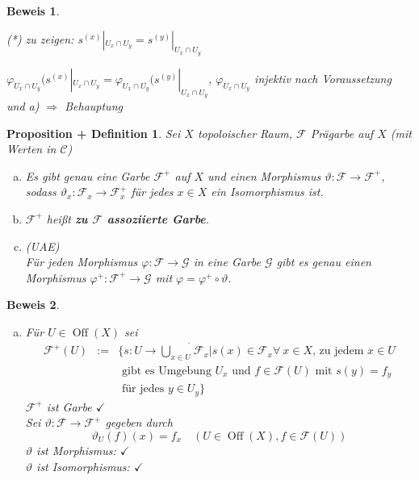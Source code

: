 \documentclass[paper = A4, fontsize=12pt, numbers=noendperiod, chapterprefix=true]{scrbook}
\theoremstyle{break}
\newtheorem{PropDef}[Def]{Proposition + Definition}
\theoremstyle{nonumberbreak}
\newtheorem{bew}{Beweis}
\theoremstyle{nonumberplain}
\newcommand{\quot}[1]{\textrm{\glqq}{#1}\textrm{\grqq}}
\newcommand{\emp}[1]{\textbf{\emph{#1}}}
\newcommand{\deftermspec}[2]{{\index{#2}}\emp{#1}}
\newenvironment{twosidedproof}{\begin{enumerate}[\quot{$\Rightarrow$}:]}{\end{enumerate}}
\DeclareMathOperator{\Off}{Off}
\newcommand{\calF}{\mathcal{F}}
\newcommand{\calG}{\mathcal{G}}
\newcommand{\calC}{\mathcal{C}}
\begin{document}
\begin{bew}
\begin{enumerate}[a)]
\begin{twosidedproof}
    (*) zu zeigen: $s^{(x)}|_{U_x\cap U_y} = s^{(y)}|_{U_x\cap U_y}$\begin{description}[\setlabelstyle{\itshape}]
    \item[denn:] $\varphi_{U_x\cap U_y}(s^{(x)}|_{U_x\cap U_y} = \varphi_{U_x\cap U_y}(s^{(y)}|_{U_x\cap U_y}$, $\varphi_{U_x\cap U_y}$ injektiv nach Voraussetzung und a) $\Rightarrow $ Behauptung
    \end{description}
  \end{twosidedproof}
\end{enumerate}\end{bew}

\begin{PropDef}
Sei $X$ topoloischer Raum, $\calF$ Pr\"agarbe auf $X$ (mit Werten in $\calC$)
\begin{enumerate}[a)]
\item
  Es gibt genau eine Garbe $\calF^+$ auf $X$ und einen Morphismus $\vartheta: \calF \to \calF^+$, sodass $\vartheta_x:\calF_x \to \calF_x^+$ f\"ur jedes $x\in X$ ein Isomorphismus ist.
\item
  $\calF^+$ hei\ss t \deftermspec{zu $\calF$ assoziierte Garbe}{Garbe!assoziierte}.
\item(UAE)\\
  F\"ur jeden Morphismus $\varphi: \calF \to \calG$ in eine Garbe $\calG$ gibt es genau einen Morphismus $\varphi^+: \calF^+ \to \calG$ mit $\varphi = \varphi^+ \circ \vartheta$.
  \begin{center}\end{center}
\end{enumerate}\end{PropDef}

\begin{bew}\begin{enumerate}[a)]\item
F\"ur $U\in \Off(X)$ sei
  \[\begin{array}{rcl}\calF^+(U) &:=& \{s: U\to \dot{\bigcup\limits_{x\in U}}\calF_x | s(x)\in \calF_x \forall\ x\in X \text{, zu jedem } x\in U \\ &&\text{ gibt es Umgebung } U_x \text{ und } f\in \calF(U) \text{ mit } s(y) = f_y \\&& \text{ f\"ur jedes } y \in U_y\}\end{array}\]
$\calF^+$ ist Garbe $\checkmark$\\
Sei $\vartheta: \calF \to \calF^+$ gegeben durch
  \[\boxed{\vartheta_U(f)(x) = f_x \quad (U\in \Off(X), f\in \calF(U))}\]
$\vartheta$ ist Morphismus: $\checkmark$\\
$\vartheta$ ist Isomorphismus: $\checkmark$
\end{enumerate}\end{bew}
\end{document}
